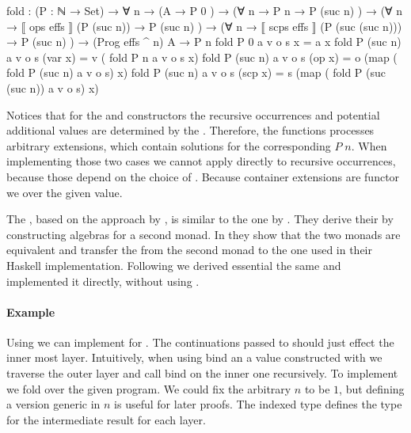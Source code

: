 \begin{code}
fold : (P : ℕ → Set) → ∀ n →
  (A                                           → P 0        )  →
  (∀ {n} → P n                                 → P (suc n)  )  →
  (∀ {n} → ⟦ ops   effs  ⟧  (P (suc n))        → P (suc n)  )  →
  (∀ {n} → ⟦ scps  effs  ⟧  (P (suc (suc n)))  → P (suc n)  )  →
  (Prog effs ^ n) A → P n
fold P 0        a v o s x         = a  x
fold P (suc n)  a v o s (var  x)  = v  (       fold P n              a v o s   x)
fold P (suc n)  a v o s (op   x)  = o  (map (  fold P (suc n)        a v o s)  x)
fold P (suc n)  a v o s (scp  x)  = s  (map (  fold P (suc (suc n))  a v o s)  x)
\end{code}
Notices that for the  and
 constructors the recursive occurrences and
potential additional values are determined by the .
Therefore, the functions processes arbitrary  extensions,
which contain solutions for the corresponding $P\;n$.
When implementing those two cases we cannot apply  directly
to recursive occurrences, because those depend on the choice of
.
Because container extensions are functor we  over the given
value.

The , based on the approach by
\textcite{DBLP:journals/corr/abs-1806-05230}, is similar to the one by
\textcite{DBLP:conf/lics/PirogSWJ18}.
They derive their  by constructing algebras for a
second monad.
In  they show that the two monads are
equivalent and transfer the  from the
second monad to the one used in their Haskell implementation.
Following \textcite{DBLP:journals/corr/abs-1806-05230} we derived essential the
same  and implemented it directly, without using
\AgdaFunction{>>=}.

\paragraph{Example}
Using  we can implement \AgdaFunction{>>=} for
\AgdaSpace{}\AgdaSpace{}.
The continuations  passed to \AgdaFunction{>>=} should just
effect the inner most layer.
Intuitively, when using bind an a value constructed with
 we traverse the outer layer and call bind on the
inner one recursively.
To implement \AgdaFunction{>>=} we fold over the given program.
We could fix the arbitrary $n$ to be $1$, but defining a version generic in $n$
is useful for later proofs.
The  indexed type  defines the type for the
intermediate result for each layer.

